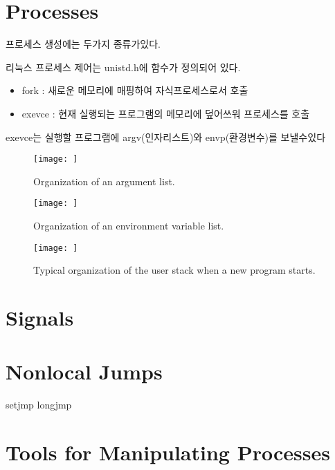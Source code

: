 \section{Processes}

프로세스 생성에는 두가지 종류가있다.

리눅스 프로세스 제어는 unistd.h에 함수가 정의되어 있다.
\begin{itemize}
    \item fork : 새로운 메모리에 매핑하여 자식프로세스로서 호출
    \item exevce : 현재 실행되는 프로그램의 메모리에 덮어쓰워 프로세스를 호출
\end{itemize}

exevce는 실행할 프로그램에 argv(인자리스트)와  envp(환경변수)를 보낼수있다

\begin{figure}[h!]
    \centering
    \texttt{[image: ]}
    \caption{Organization of an argument list.}
\end{figure}


\begin{figure}[h!]
    \centering
    \texttt{[image: ]}
    \caption{Organization of an environment variable list.}
\end{figure}

\begin{figure}[h!]
    \centering
    \texttt{[image: ]}
    \caption{Typical organization of the user stack when a    new program starts.}
\end{figure}



\section{Signals}


\section{Nonlocal Jumps}

setjmp longjmp

\section{Tools for Manipulating Processes}

